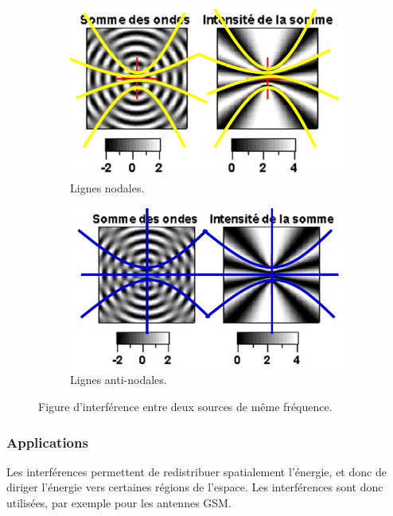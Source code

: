 \begin{figure}[ht]
	\centering
	\begin{subfigure}[b]{0.45\textwidth}
		\includegraphics[scale=0.8]{fig_interferences_nodales.png}
		\caption{Lignes nodales.}
		\label{fig:nodale}
	\end{subfigure}
	\begin{subfigure}[b]{0.45\textwidth}
		\includegraphics[scale=0.8]{fig_interferences_antinodales.png}
	\caption{Lignes anti-nodales.}
	\label{fig:antinodale}
	\end{subfigure}
	\caption{Figure d'interférence entre deux sources de même fréquence.}
\end{figure}

\subsubsection{Applications}
Les interférences permettent de redistribuer spatialement l'énergie,
et donc de diriger l'énergie vers certaines régions de l'espace.
Les interférences sont donc utilisées, par exemple pour les antennes
GSM.

